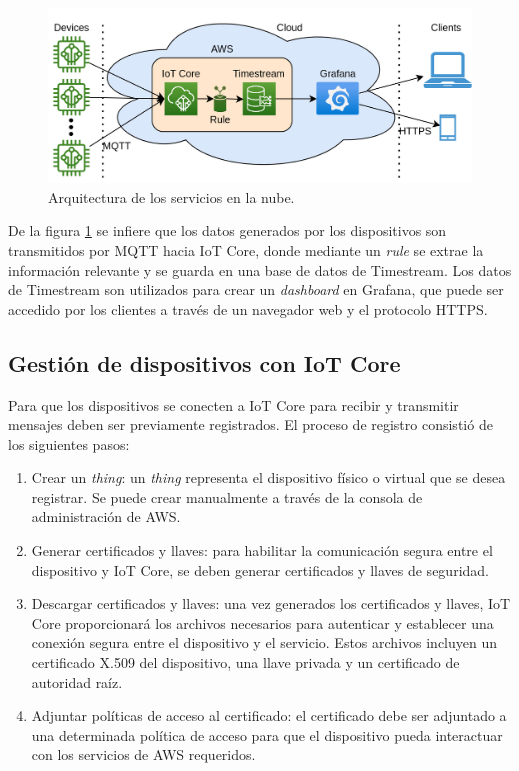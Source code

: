 \begin{figure}[h]
	\centering
	\includegraphics[scale=0.22]{./Figures/cc_diagram.png}
	\caption{Arquitectura de los servicios en la nube.}
	\label{fig:cc_diagram}
\end{figure}

De la figura \ref{fig:cc_diagram} se infiere que los datos generados por los dispositivos son transmitidos por MQTT hacia IoT Core, donde mediante un \textit{rule} se extrae la información relevante y se guarda en una base de datos de Timestream. Los datos de Timestream son utilizados para crear un \textit{dashboard} en Grafana, que puede ser accedido por los clientes a través de un navegador web y el protocolo HTTPS.

\subsection{Gestión de dispositivos con IoT Core}
\label{subsection3_3_1}
Para que los dispositivos se conecten a IoT Core para recibir y transmitir mensajes deben ser previamente registrados. El proceso de registro consistió de los siguientes pasos:

\begin{enumerate}
	\item Crear un \textit{thing}: un \textit{thing} representa el dispositivo físico o virtual que se desea registrar. Se puede crear manualmente a través de la consola de administración de AWS.
	\item Generar certificados y llaves: para habilitar la comunicación segura entre el dispositivo y IoT Core, se deben generar certificados y llaves de seguridad.
	\item Descargar certificados y llaves: una vez generados los certificados y llaves, IoT Core proporcionará los archivos necesarios para autenticar y establecer una conexión segura entre el dispositivo y el servicio. Estos archivos incluyen un certificado X.509 \cite{x509_info} del dispositivo, una llave privada y un certificado de autoridad raíz.
	\item Adjuntar políticas de acceso al certificado: el certificado debe ser adjuntado a una determinada política de acceso para que el dispositivo pueda interactuar con los servicios de AWS requeridos.
\end{enumerate}

